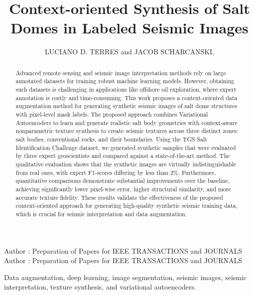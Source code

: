 \documentclass{ieeeaccess}
\begin{document}

\title{Context-oriented Synthesis of Salt Domes in Labeled Seismic Images}
\author{\uppercase{Luciano D. Terres} and
\uppercase{Jacob Scharcanski},  }

\address[1]{Institute of Informatics,
Federal University of Rio Grande do Sul, Porto Alegre, RS, Brasil, 91501-970 (e-mail: ldterres@inf.ufrgs.br; jacobs@inf.ufrgs.br)}

\markboth
{Author \headeretal: Preparation of Papers for IEEE TRANSACTIONS and JOURNALS}
{Author \headeretal: Preparation of Papers for IEEE TRANSACTIONS and JOURNALS}



\begin{abstract}
Advanced remote sensing and seismic image interpretation methods rely on large annotated datasets for training robust machine learning models. However, obtaining such datasets is challenging in applications like offshore oil exploration, where expert annotation is costly and time-consuming. This work proposes a context-oriented data augmentation method for generating synthetic seismic images of salt dome structures with pixel-level mask labels. The proposed approach combines Variational Autoencoders to learn and generate realistic salt body geometries with context-aware nonparametric texture synthesis to create seismic textures across three distinct zones: salt bodies, conventional rocks, and their boundaries. Using the TGS Salt Identification Challenge dataset, we generated synthetic samples that were evaluated by three expert geoscientists and compared against a state-of-the-art method. The qualitative evaluation shows that the synthetic images are virtually indistinguishable from real ones, with expert F1-scores differing by less than 2\%. Furthermore, quantitative comparisons demonstrate substantial improvements over the baseline, achieving significantly lower pixel-wise error, higher structural similarity, and more accurate texture fidelity. These results validate the effectiveness of the proposed context-oriented approach for generating high-quality synthetic seismic training data, which is crucial for seismic interpretation and data augmentation.
\end{abstract}

\begin{keywords}
Data augmentation, deep learning, image segmentation, seismic images, seismic interpretation, texture synthesis, and variational autoencoders.
\end{keywords}
\end{document}
